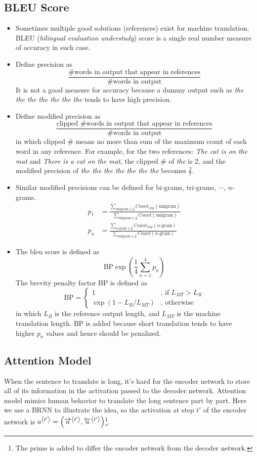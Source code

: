 \subsection{BLEU Score}
\begin{itemize}
  \item Sometimes multiple good solutions (references) exist for machine translation. BLEU (\textit{bilingual evaluation understudy}) score is a single real number measure of accuracy in such case.
  \item Define precision as
  \[\frac{\text{\# words in output that appear in references}}{\text{\# words in output}}\]
  It is not a good measure for accuracy because a dummy output such as \textit{the the the the the the the} tends to have high precision.
  \item Define modified precision as  
  \[\frac{\text{clipped \# words in output that appear in references}}{\text{\# words in output}}\]
  in which clipped \# means no more than sum of the maximum count of each word in any reference. For example, for the two references: \textit{The cat is on the mat} and \textit{There is a cat on the mat}, the clipped \# of \textit{the} is 2, and the modified precision of \textit{the the the the the the the} becomes $\frac{2}{7}$. 
  \item Similar modified precisions can be defined for bi-grams, tri-grams, $\cdots$, $n$-grams.
  \begin{align*}
    p_1&=\frac{\displaystyle\sum_{\text{unigram}\in\hat{y}}Count_{clip}(\text{unigram})}{\displaystyle\sum_{\text{unigram}\in\hat{y}}Count(\text{unigram})}\\
    p_n&=\frac{\displaystyle\sum_{n\text{-gram}\in\hat{y}}Count_{clip}(n\text{-gram})}{\displaystyle\sum_{\text{unigram}\in\hat{y}}Count(n\text{-gram})}
  \end{align*}
  \item The bleu score is defined as 
  \[\text{BP}\exp\left(\frac{1}{4}\displaystyle\sum_{n=1}^4p_n\right)\]
  The brevity penalty factor BP is defined as 
  \[\text{BP}=\begin{cases}
    1 & \text{, if }L_{MT}>L_R \\
    \exp\left(1-L_{R}/L_{MT}\right) & \text{, otherwise }
  \end{cases}\]
  in which $L_R$ is the reference output length, and $L_{MT}$ is the machine translation length. BP is added because short translation tends to have higher $p_n$ values and hence should be penalized.
\end{itemize}
\subsection{Attention Model}
When the sentence to translate is long, it's hard for the encoder network to store all of its information in the activation passed to the decoder network. Attention model mimics human behavior to translate the long sentence part by part. Here we use a BRNN to illustrate the idea, so the activation at step $t'$ of the encoder network is $a^{\left\langle t'\right\rangle}=\left(\overrightarrow{a}^{\left\langle t'\right\rangle},\overleftarrow{a}^{\left\langle t'\right\rangle}\right)$\footnote{The prime is added to differ the encoder network from the decoder network.}.

